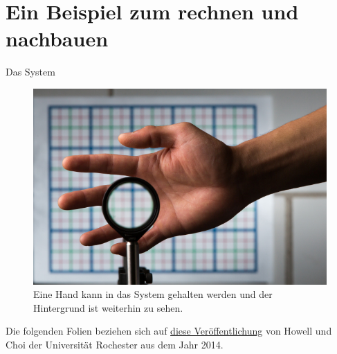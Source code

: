 \section{Ein Beispiel zum rechnen und nachbauen}

\begin{frame}{Das System}
  \begin{figure}
    \caption{Eine Hand kann in das System gehalten werden und der Hintergrund ist weiterhin zu sehen.}
    \centering
    \includegraphics[height=0.6\textheight]{images/hand-cloak.jpg}
  \end{figure}
  Die folgenden Folien beziehen sich auf
  \href{https://www.rochester.edu/newscenter/watch-rochester-cloak-uses-ordinary-lenses-to-hide-objects-across-continuous-range-of-angles-70592/}{diese Veröffentlichung}
  von Howell und Choi der Universität Rochester aus dem Jahr 2014.
\end{frame}

